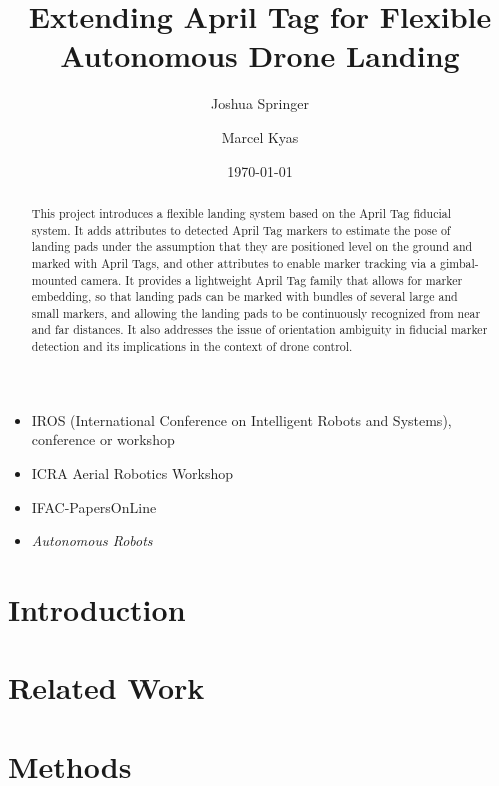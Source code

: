 \documentclass[conference]{IEEEtran}
\author{Joshua Springer \and Marcel Kyas}
\title{Extending April Tag for Flexible Autonomous Drone Landing}
\date{\specialdate\today}
\begin{document}
    \maketitle

    \begin{abstract}
        This project introduces a flexible landing system based on the April Tag\cite{apriltag3_paper} fiducial system.
        It adds attributes to detected April Tag markers to estimate the pose of landing pads
        under the assumption that they are positioned level on the ground and marked with April Tags,
        and other attributes to enable marker tracking via a gimbal-mounted camera.
        It provides a lightweight April Tag family that allows for marker embedding,
        so that landing pads can be marked with bundles of several large and small markers,
        and allowing the landing pads to be continuously recognized from near and far distances.
        It also addresses the issue of orientation ambiguity in fiducial marker detection
        and its implications in the context of drone control.
    \end{abstract}
    

    {
    \color{red}
    \begin{itemize}
        \item IROS (International Conference on Intelligent Robots and Systems), conference or workshop
        \item ICRA Aerial Robotics Workshop
        \item IFAC-PapersOnLine
        \item \textit{Autonomous Robots}
    \end{itemize}
    }

    \section{Introduction}
    \label{section:introduction}
    

    \section{Related Work}
    \label{section:related_work}
    

    \section{Methods}
    \label{section:methods}
    

    
    
\end{document}
